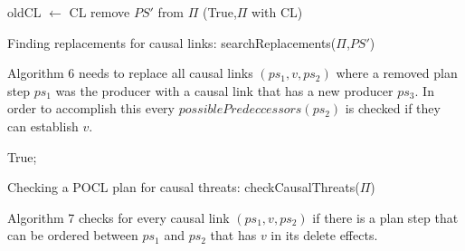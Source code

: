 \newpage
\begin{algorithm}[h]
    \SetAlgoLined
    oldCL $\leftarrow$ CL\;
    remove $PS'$ from $\Pi$\;
    \Return (True,$\Pi$ with CL)\;
    \caption{Finding replacements for causal links: searchReplacements($\Pi$,$PS'$)}
\end{algorithm}

Algorithm 6 needs to replace all causal links $(ps_1,v,ps_2)$ where a removed plan step $ps_1$ was the producer with a causal link that has a new producer $ps_3$.
In order to accomplish this every $possiblePredeccessors(ps_2)$ is checked if they can establish $v$.


\begin{algorithm}[H]
    \SetAlgoLined
    \Return True;
    \caption{Checking a POCL plan for causal threats: checkCausalThreats($\Pi$)}
\end{algorithm}

Algorithm 7 checks for every causal link $(ps_1,v,ps_2)$ if there is a plan step that can be ordered between $ps_1$ and $ps_2$ that 
has $v$ in its delete effects.

